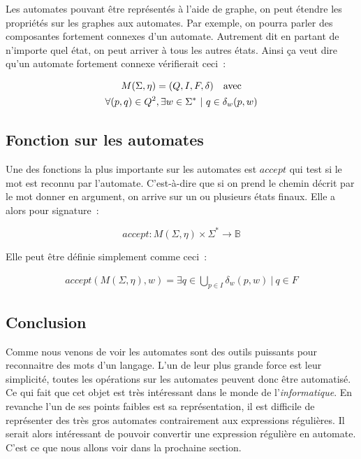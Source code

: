 \vphantom{}

Les automates pouvant être représentés à l'aide de graphe, on peut étendre les
propriétés sur les graphes aux automates. Par exemple, on pourra parler des
composantes fortement connexes d'un automate. Autrement dit en partant de
n'importe quel état, on peut arriver à tous les autres états. Ainsi ça veut
dire qu'un automate fortement connexe vérifierait ceci~:

\begin{gather}
    M(\Sigma, \eta) = (Q, I, F, \delta) \quad \text{avec} \\
    \forall (p, q) \in Q^2, \exists w \in \Sigma^* ~|~ q \in \delta_w(p, w) \notag
\end{gather}

\subsection{Fonction sur les automates}

Une des fonctions la plus importante sur les automates est \(accept\) qui test
si le mot est reconnu par l'automate. C'est-à-dire que si on prend le chemin
décrit par le mot donner en argument, on arrive sur un ou plusieurs états
finaux. Elle a alors pour signature~:

\[
    accept: M(\Sigma, \eta) \times \Sigma^* \to \mathbb{B}
\]

Elle peut être définie simplement comme ceci~:

\begin{align}
    accept(M(\Sigma, \eta), w) = \exists q \in \bigcup_{p \in I} \delta_w(p, w) ~|~ q \in F
\end{align}

\subsection{Conclusion}

Comme nous venons de voir les automates sont des outils puissants pour
reconnaitre des mots d'un langage. L'un de leur plus grande force est leur
simplicité, toutes les opérations sur les automates peuvent donc être
automatisé. Ce qui fait que cet objet est très intéressant dans le monde de
l'\textit{informatique}. En revanche l'un de ses points faibles est sa
représentation, il est difficile de représenter des très gros automates
contrairement aux expressions régulières. Il serait alors intéressant de
pouvoir convertir une expression régulière en automate. C'est ce que nous
allons voir dans la prochaine section.